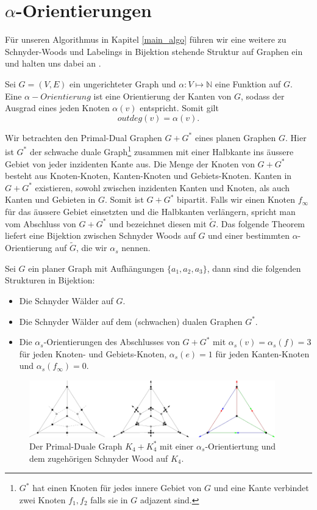 \section{$\alpha$-Orientierungen}\label{alpha_orientations}

Für unseren Algorithmus in Kapitel \ref{main_algo} führen wir eine weitere zu Schnyder-Woods und Labelings in Bijektion stehende Struktur auf Graphen ein und halten uns dabei an \cite{felsner04}.

Sei $G=(V,E)$ ein ungerichteter Graph und $\alpha:V\mapsto\mathbb{N}$ eine Funktion auf $G$. Eine $\alpha-Orientierung$ ist eine Orientierung der Kanten von $G$, sodass der Ausgrad eines jeden Knoten $\alpha(v)$ entspricht. Somit gilt $$outdeg(v) = \alpha(v).$$

Wir betrachten den Primal-Dual Graphen $G+G^*$ eines planen Graphen $G$. Hier ist $G^*$ der schwache duale Graph\footnote{$G^*$ hat einen Knoten für jedes innere Gebiet von $G$ und eine Kante verbindet zwei Knoten $f_1,f_2$ falls sie in $G$ adjazent sind.} zusammen mit einer Halbkante ins äussere Gebiet von jeder inzidenten Kante aus. Die Menge der Knoten von $G+G^*$ besteht aus Knoten-Knoten, Kanten-Knoten und Gebiets-Knoten. Kanten in $G+G^*$ existieren, sowohl zwischen inzidenten Kanten und Knoten, als auch Kanten und Gebieten in $G$. Somit ist $G+G^*$ bipartit. Falls wir einen Knoten $f_\infty$ für das äussere Gebiet einsetzten und die Halbkanten verlängern, spricht man vom Abschluss von $G+G^*$ und bezeichnet diesen mit $\tilde{G}$. Das folgende Theorem liefert eine Bijektion zwischen Schnyder Woods auf $G$ und einer bestimmten $\alpha$-Orientierung auf $\tilde{G}$, die wir $\alpha_s$ nennen.

\begin{theorem}\label{alpha_bij}
Sei $G$ ein planer Graph mit Aufhängungen $\{a_1,a_2,a_3\}$, dann sind die folgenden Strukturen in Bijektion:
\begin{itemize}
\item Die Schnyder Wälder auf $G$.
\item Die Schnyder Wälder auf dem (schwachen) dualen Graphen $G^*$.
\item Die $\alpha_{s}$-Orientierungen des Abschlusses von $G+G^*$ mit $\alpha_s(v) = \alpha_s(f) = 3$ für jeden Knoten- und Gebiets-Knoten,  $\alpha_s(e) = 1$ für jeden Kanten-Knoten und  $\alpha_s(f_\infty) = 0$.
\end{itemize}
\end{theorem}

\begin{figure}[h]
	\centering
  \includegraphics[width=0.95\textwidth]{alpha_ex.png}
  \caption{Der Primal-Duale Graph $K_4+K_4^*$ mit einer $\alpha_s$-Orientiertung und dem zugehörigen Schnyder Wood auf $K_4$. }
\end{figure}